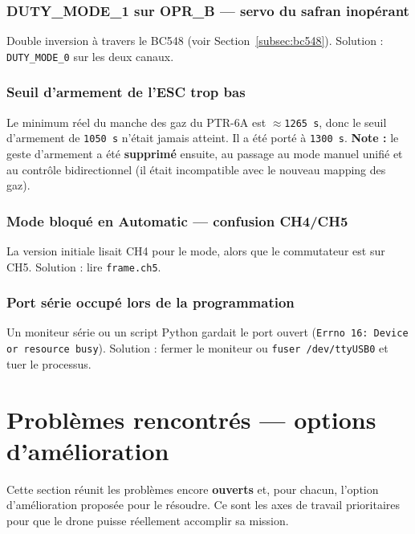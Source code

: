 \documentclass[12pt,a4paper]{article}
\newcommand{\us}[1]{\texttt{#1\,\textmu s}}
\begin{document}
\subsubsection{DUTY\_MODE\_1 sur OPR\_B --- servo du safran inop\'erant}

Double inversion à travers le BC548 (voir Section~\ref{subsec:bc548}). Solution :
\texttt{DUTY\_MODE\_0} sur les deux canaux.

\subsubsection{Seuil d'armement de l'ESC trop bas}

Le minimum r\'eel du manche des gaz du PTR-6A est $\approx$\us{1265}, donc le seuil
d'armement de \us{1050} n'\'etait jamais atteint. Il a \'et\'e port\'e à \us{1300}.
\textbf{Note :} le geste d'armement a \'et\'e \textbf{supprim\'e} ensuite, au passage
au mode manuel unifi\'e et au contr\^ole bidirectionnel (il \'etait incompatible avec
le nouveau mapping des gaz).

\subsubsection{Mode bloqu\'e en Automatic --- confusion CH4/CH5}

La version initiale lisait CH4 pour le mode, alors que le commutateur est sur CH5.
Solution : lire \texttt{frame.ch5}.

\subsubsection{Port s\'erie occup\'e lors de la programmation}

Un moniteur s\'erie ou un script Python gardait le port ouvert
(\texttt{Errno 16: Device or resource busy}). Solution : fermer le moniteur ou
\texttt{fuser /dev/ttyUSB0} et tuer le processus.

\section{Probl\`emes rencontr\'es --- options d'am\'elioration}
\label{sec:abiertos}

Cette section r\'eunit les probl\`emes encore \textbf{ouverts} et, pour chacun,
l'option d'am\'elioration propos\'ee pour le r\'esoudre. Ce sont les axes de travail
prioritaires pour que le drone puisse r\'eellement accomplir sa mission.
\end{document}
